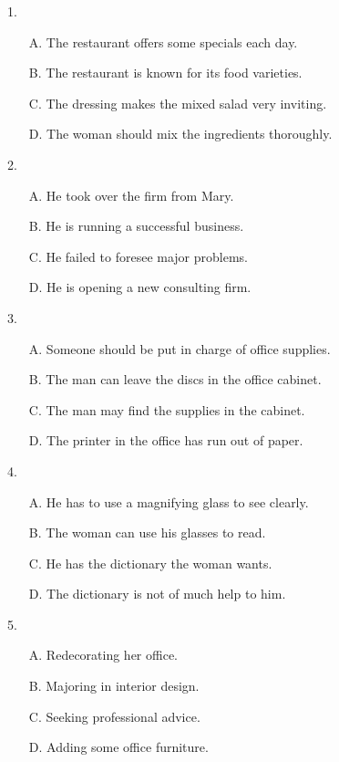 \documentclass[UTF8,11pt]{ctexart}
\begin{document}
1.


\begin{itemize}[leftmargin=2em,itemsep=.2em,topsep=.4em]\item[A.] The restaurant offers some specials each day.
\item[B.] The restaurant is known for its food varieties.
\item[C.] The dressing makes the mixed salad very inviting.
\item[D.] The woman should mix the ingredients thoroughly.
\end{itemize}

2.


\begin{itemize}[leftmargin=2em,itemsep=.2em,topsep=.4em]\item[A.] He took over the firm from Mary.
\item[B.] He is running a successful business.
\item[C.] He failed to foresee major problems.
\item[D.] He is opening a new consulting firm.
\end{itemize}

3.


\begin{itemize}[leftmargin=2em,itemsep=.2em,topsep=.4em]\item[A.] Someone should be put in charge of office supplies.
\item[B.] The man can leave the discs in the office cabinet.
\item[C.] The man may find the supplies in the cabinet.
\item[D.] The printer in the office has run out of paper.
\end{itemize}

4.


\begin{itemize}[leftmargin=2em,itemsep=.2em,topsep=.4em]\item[A.] He has to use a magnifying glass to see clearly.
\item[B.] The woman can use his glasses to read.
\item[C.] He has the dictionary the woman wants.
\item[D.] The dictionary is not of much help to him.
\end{itemize}

5.


\begin{itemize}[leftmargin=2em,itemsep=.2em,topsep=.4em]\item[A.] Redecorating her office.
\item[B.] Majoring in interior design.
\item[C.] Seeking professional advice.
\item[D.] Adding some office furniture.
\end{itemize}
\end{document}
